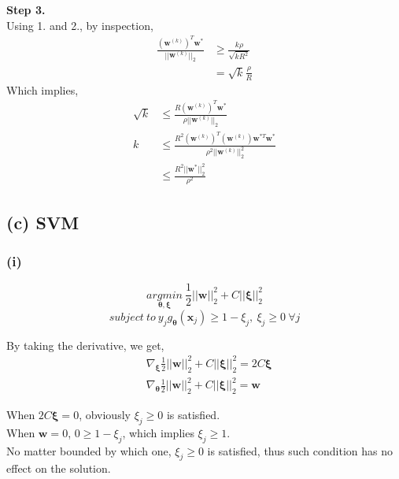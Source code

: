 \documentclass[11pt]{article}
\begin{document}
\noindent \textbf{Step 3.}\\
Using 1. and 2., by inspection,
\begin{equation}
\begin{split}
\frac{(\pmb{w}^{(k)})^T\pmb{w}^*}{||\pmb{w}^{(k)}||_2}&\ge \frac{k\rho}{\sqrt{kR^2}}\\
&= \sqrt{k}\frac{\rho}{R}
\end{split}
\end{equation}
Which implies,
\begin{equation}
\begin{split}
\sqrt{k}&\le \frac{R(\pmb{w}^{(k)})^T\pmb{w}^*}{\rho||\pmb{w}^{(k)}||_2}\\
k&\le \frac{R^2(\pmb{w}^{(k)})^T(\pmb{w}^{(k)})\pmb{w}^{*T}\pmb{w}^*}{\rho^2||\pmb{w}^{(k)}||^2_2}\\
&\le \frac{R^2||\pmb{w}^*||^2_2}{\rho^2}
\end{split}
\end{equation}

\pagebreak
\subsection*{(c) SVM}
\subsubsection*{(i)}
$$\underset{\pmb{\theta},\pmb{\xi}}{argmin}\ \frac{1}{2}||\pmb{w}||^2_2+C||\pmb{\xi}||^2_2$$
$$subject\ to\ y_jg_{\pmb{\theta}}(\pmb{x}_j)\ge 1-\xi_j,\ \xi_j\ge 0\ \forall j$$

\noindent By taking the derivative, we get,
\begin{equation}
\begin{split}
&\nabla_{\pmb{\xi}}\frac{1}{2}||\pmb{w}||^2_2+C||\pmb{\xi}||^2_2=2C\pmb{\xi}\\
&\nabla_{\pmb{\theta}}\frac{1}{2}||\pmb{w}||^2_2+C||\pmb{\xi}||^2_2=\pmb{w}
\end{split} 
\end{equation}

\noindent When $2C\pmb{\xi}=0$, obviously $\xi_j \ge 0$ is satisfied.\\
When $\pmb{w}=0$, $0\ge 1-\xi_j$, which implies $\xi_j\ge 1$.\\
No matter bounded by which one, $\xi_j \ge 0$ is satisfied, thus such condition has no effect on the solution.
\end{document}
